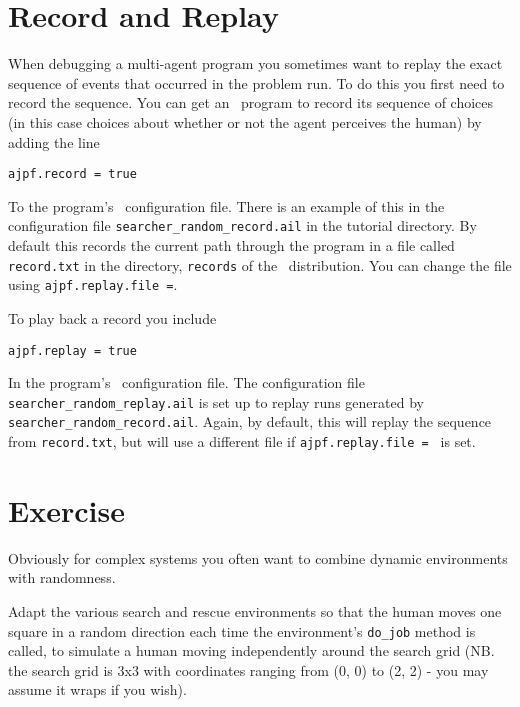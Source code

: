 \section{Record and Replay}
When debugging a multi-agent program you sometimes want to replay the exact sequence of events that occurred in the  problem run.  To do this you first need to record the sequence.  You can get an \ail\ program to record its sequence of choices (in this case choices about whether or not the agent perceives the human) by adding the line

\begin{verbatim}
ajpf.record = true
\end{verbatim}

\begin{sloppypar}
To the program's \ail\ configuration file.  There is an example of this in the configuration file \texttt{searcher\_random\_record.ail} in the tutorial directory.  By default this records the current path through the program in a file called \texttt{record.txt} in the directory, \texttt{records} of the \mcapl\ distribution.  You can change the file using \texttt{ajpf.replay.file =}.  
\end{sloppypar}

To play back a record you include
\begin{verbatim}
ajpf.replay = true
\end{verbatim}
\begin{sloppypar}
In the program's \ail\ configuration file.  The configuration file \texttt{searcher\_random\_replay.ail} is set up to replay runs generated by \texttt{searcher\_random\_record.ail}.  Again, by default, this will replay the sequence from \texttt{record.txt}, but will use a different file if \texttt{ajpf.replay.file = } is set.  
\end{sloppypar}

\section{Exercise}

Obviously for complex systems you often want to combine dynamic environments with randomness.  

Adapt the various search and rescue environments so that the human moves one square in a random direction each time the environment's \texttt{do\_job} method is called, to simulate a human moving independently around the search grid (NB. the search grid is 3x3 with coordinates ranging from (0, 0) to (2, 2) - you may assume it wraps if you wish).  


